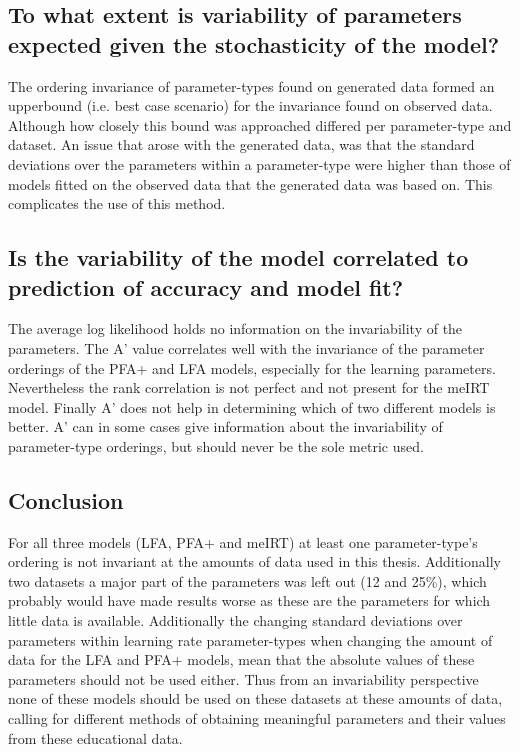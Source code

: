 \documentclass{scrartcl}
\begin{document}
\subsection{To what extent is variability of parameters expected given the stochasticity of the model?}
The ordering invariance of parameter-types found on generated data formed an upperbound (i.e. best case scenario) for the invariance found on observed data. Although how closely this bound was approached differed per parameter-type and dataset. An issue that arose with the generated data, was that the standard deviations over the parameters within a parameter-type were higher than those of models fitted on the observed data that the generated data was based on. This complicates the use of this method. 

\subsection{Is the variability of the model correlated to prediction of accuracy and model fit?}
The average log likelihood holds no information on the invariability of the parameters. The A' value correlates well with the invariance of the parameter orderings of the PFA+ and LFA models, especially for the learning parameters. Nevertheless the rank correlation is not perfect and not present for the meIRT model. Finally A' does not help in determining which of two different models is better. A' can in some cases give information about the invariability of parameter-type orderings, but should never be the sole metric used.

\subsection{Conclusion}
For all three models (LFA, PFA+ and meIRT) at least one parameter-type's ordering is not invariant at the amounts of data used in this thesis. Additionally two datasets a major part of the parameters was left out (12 and 25\%), which probably would have made results worse as these are the parameters for which little data is available. Additionally the changing standard deviations over parameters within learning rate parameter-types when changing the amount of data for the LFA and PFA+ models, mean that the absolute values of these parameters should not be used either. Thus from an invariability perspective none of these models should be used on these datasets at these amounts of data, calling for different methods of obtaining meaningful parameters and their values from these educational data.    
\end{document}
